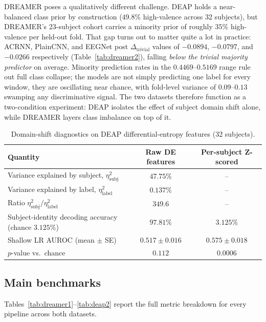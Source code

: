 \documentclass[a4paper,fleqn]{cas-sc}
\begin{document}
DREAMER poses a qualitatively different challenge. DEAP holds a near-balanced class prior by construction ($49.8\%$ high-valence across 32 subjects), but DREAMER's 23-subject cohort carries a minority prior of roughly $35\%$ high-valence per held-out fold. That gap turns out to matter quite a lot in practice: ACRNN, PlainCNN, and EEGNet post $\Delta_{\mathrm{trivial}}$ values of $-0.0894$, $-0.0797$, and $-0.0266$ respectively (Table~\ref{tab:dreamer2}), falling \emph{below the trivial majority predictor} on average. Minority prediction rates in the $0.4469$--$0.5169$ range rule out full class collapse; the models are not simply predicting one label for every window, they are oscillating near chance, with fold-level variance of $0.09$--$0.13$ swamping any discriminative signal. The two datasets therefore function as a two-condition experiment: DEAP isolates the effect of subject domain shift alone, while DREAMER layers class imbalance on top of it.

\begin{table}[t]
\centering
\caption{Domain-shift diagnostics on DEAP differential-entropy features (32 subjects).}
\label{tab:diag}
\small
\begin{tabular}{lcc}
\toprule
Quantity & Raw DE features & Per-subject Z-scored \\
\midrule
Variance explained by subject, $\eta^2_{\mathrm{subj}}$ & $47.75\%$ & -- \\
Variance explained by label, $\eta^2_{\mathrm{label}}$ & $0.137\%$ & -- \\
Ratio $\eta^2_{\mathrm{subj}}/\eta^2_{\mathrm{label}}$ & $349.6$ & -- \\
Subject-identity decoding accuracy (chance $3.125\%$) & $97.81\%$ & $3.125\%$ \\
Shallow LR AUROC (mean $\pm$ SE) & $0.517\pm0.016$ & $0.575\pm0.018$ \\
$p$-value vs.\ chance & $0.112$ & $0.0006$ \\
\bottomrule
\end{tabular}
\end{table}

\subsection{Main benchmarks}
Tables~\ref{tab:dreamer1}--\ref{tab:deap2} report the full metric breakdown for every pipeline across both datasets.
\end{document}
